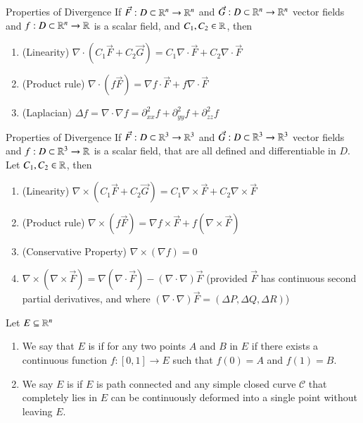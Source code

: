 \documentclass[12pt]{report}
\begin{document}
\begin{appendices}
    \begin{prop}{Properties of Divergence}{}
        If $\vec{F}:D\subset \mathbb R^n \rightarrow \mathbb R^n$ and $\vec{G}:D\subset \mathbb R^n \rightarrow \mathbb R^n$ vector fields and $f:D\subset \mathbb R^n \rightarrow \mathbb R$ is a scalar field, and $C_1,C_2 \in \mathbb R$, then \begin{enumerate}
            \item (Linearity) $\nabla \cdot (C_1\vec{F} + C_2\vec{G}) = C_1\nabla \cdot \vec{F} + C_2\nabla \cdot \vec{F}$
            \item (Product rule) $\nabla \cdot (f\vec{F}) = \nabla f \cdot \vec{F} + f\nabla\cdot \vec{F}$
            \item (Laplacian) $\Delta f = \nabla \cdot \nabla f = \partial_{xx}^2f + \partial_{yy}^2f + \partial_{zz}^2f$
        \end{enumerate}
    \end{prop}
    
    \begin{prop}{Properties of Divergence}{}
        If $\vec{F}:D\subset \mathbb R^3 \rightarrow \mathbb R^3$ and $\vec{G}:D\subset \mathbb R^3 \rightarrow \mathbb R^3$ vector fields and $f:D\subset \mathbb R^3 \rightarrow \mathbb R$ is a scalar field, that are all defined and differentiable in $D$. Let $C_1,C_2 \in \mathbb R$, then \begin{enumerate}
            \item (Linearity) $\nabla \times (C_1\vec{F} + C_2\vec{G}) = C_1\nabla \times \vec{F} + C_2\nabla \times \vec{F}$
            \item (Product rule) $\nabla \times (f\vec{F}) = \nabla f \times \vec{F} + f(\nabla\times \vec{F})$
            \item (Conservative Property) $\nabla \times (\nabla f) = 0$
            \item $\nabla \times(\nabla \times \vec{F}) = \nabla(\nabla\cdot \vec{F}) - (\nabla \cdot \nabla)\vec{F}$ (provided $\vec{F}$ has continuous second partial derivatives, and where $(\nabla \cdot \nabla)\vec{F} = (\Delta P, \Delta Q, \Delta R)$)
        \end{enumerate}
    \end{prop}
    
    \begin{defn}{}{}
        Let $E \subseteq \mathbb R^n$ \begin{enumerate}
            \item We say that $E$ is  if for any two points $A$ and $B$ in $E$ if there exists a continuous function $f:[0,1] \rightarrow E$ such that $f(0) = A$ and $f(1) = B$.
            \item We say $E$ is  if $E$ is path connected and any simple closed curve $\mathcal{C}$ that completely lies in $E$ can be continuously deformed into a single point without leaving $E$.
        \end{enumerate}
    \end{defn}
    

\end{appendices}
\end{document}
